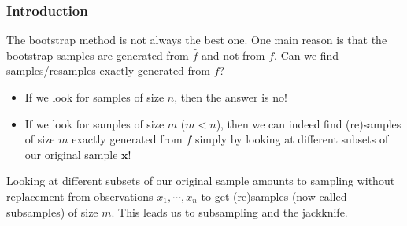 \frame
{
\frametitle{Introduction}

The bootstrap method is not always the best one. One main reason is that the bootstrap samples are generated from $\hat{f}$ and not from $f$. \alert{Can we find samples/resamples exactly generated from $f$?}

\begin{itemize}
\item If we look for samples of size $n$, then the answer is \alert{no}!
\item If we look for samples of size $m$ ($m<n$), then we can indeed find (re)samples of size $m$ exactly generated from $f$ simply by looking at different subsets of our original sample $\mathbf{x}$! 
\end{itemize}

Looking at different subsets of our original sample amounts to sampling without replacement from observations $x_1,\cdots,x_n$ to get (re)samples (now called \alert{subsamples}) of size $m$. This leads us to subsampling and the jackknife.  
}

